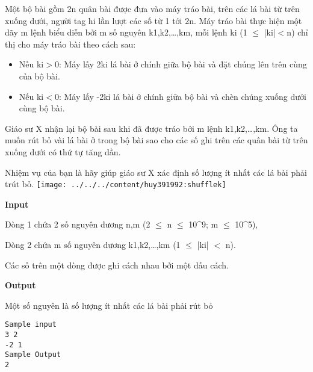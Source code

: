 

Một bộ bài gồm 2n quân bài được đưa vào máy tráo bài, trên các lá bài từ trên xuống dưới, người tag hi lần lượt các số từ 1 tới 2n. Máy tráo bài thực hiện một dãy m lệnh biểu diễn bởi m số nguyên k1,k2,…,km, mỗi lệnh ki (1 $\le$ |ki|$<$n) chỉ thị cho máy tráo bài theo cách sau:
\begin{itemize}
	\item Nếu ki$>$0: Máy lấy 2ki lá bài ở chính giữa bộ bài và đặt chúng lên trên cùng của bộ bài.
\end{itemize}
\begin{itemize}
	\item Nếu ki$<$0: Máy lấy -2ki lá bài ở chính giữa bộ bài và chèn chúng xuống dưới cùng bộ bài.
\end{itemize}

Giáo sư X nhận lại bộ bài sau khi đã được tráo bởi m lệnh k1,k2,…,km. Ông ta muốn rút bỏ vài lá bài ở trong bộ bài sao cho các số ghi trên các quân bài từ trên xuống dưới có thứ tự tăng dần.

Nhiệm vụ của bạn là hãy giúp giáo sư X xác định số lượng ít nhất các lá bài phải trút bỏ.
\texttt{[image: ../../../content/huy391992:shufflek]}

\textbf{Input}

Dòng 1 chứa 2 số nguyên dương n,m (2  $\le$  n  $\le$  10\textasciicircum9; m  $\le$  10\textasciicircum5),

Dòng 2 chứa m số nguyên dương k1,k2,…,km (1  $\le$  |ki| $<$ n).

Các số trên một dòng được ghi cách nhau bởi một dấu cách.

\textbf{Output}

Một số nguyên là số lượng ít nhất các lá bài phải rút bỏ
\begin{verbatim}
Sample input
3 2
-2 1
Sample Output
2\end{verbatim}

 
